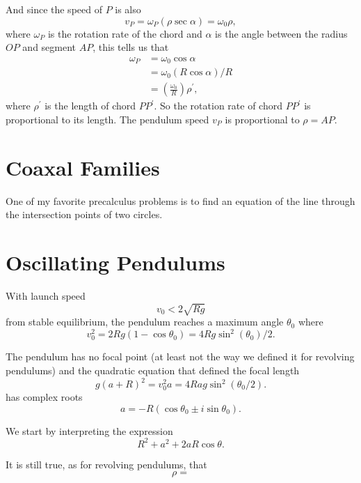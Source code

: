 \documentclass{ximera}
\begin{document}
And since the speed of $P$ is also
\[
  v_P = \omega_P (\rho \sec\alpha)  = \omega_0 \rho , 
\]
where $\omega_P$ is the rotation rate of the chord and $\alpha$ is the angle between the radius $OP$ and segment $AP$, this tells us that
\begin{align*}
\omega_P &= \omega_0  \cos  \alpha  \\
                &= \omega_0 (R\cos \alpha) / R \\
                & = \left( \frac{\omega_0}{R} \right) \rho^\prime ,
\end{align*}
where $\rho^\prime$ is the length of chord $PP^\prime$. So the rotation rate of chord $PP^\prime$ is proportional to its length. The pendulum speed $v_P$ is proportional to $\rho = AP$.


\section{Coaxal Families}
One of my favorite precalculus problems is to find an equation of the line through the intersection points of two circles.


\section{Oscillating Pendulums}
With launch speed
\[
   v_0 < 2\sqrt{Rg}
\]
from stable equilibrium, the pendulum reaches a maximum angle $\theta_0$ where 
\[
    v_0^2 = 2Rg(1-\cos\theta_0) = 4Rg\sin^2 (\theta_0)/2 .
\]

The pendulum has no focal point (at least not the way we defined it for revolving pendulums) and the quadratic equation that defined the focal length 
\[
     g(a+R)^2 = v_0^2 a = 4Rag\sin^2 (\theta_0/2) .
\]
has complex roots
\[
     a = -R(\cos \theta_0 \pm i \sin \theta_0).
\]

We start by interpreting the expression
\[
       R^2 + a^2 + 2aR\cos\theta.
\]


It is still true, as for revolving pendulums, that
\[
  \rho = 
\]
\end{document}
